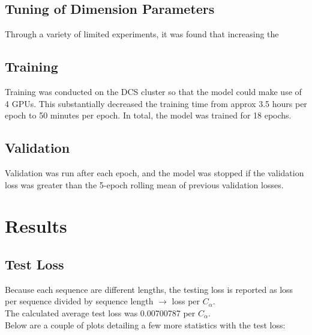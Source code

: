 \documentclass[11pt]{article}
\begin{document}
\subsection{Tuning of Dimension Parameters}
Through a variety of limited experiments, it was found that increasing the 

\subsection{Training}
Training was conducted on the DCS cluster so that the model could make use of 4 GPUs.  This substantially decreased the training time from approx 3.5 hours per epoch to 50 minutes per epoch.  In total, the model was trained for 18 epochs.

\subsection{Validation}
Validation was run after each epoch, and the model was stopped if the validation loss was greater than the 5-epoch rolling mean of previous validation losses.

\section{Results}
\subsection{Test Loss}
Because each sequence are different lengths, the testing loss is reported as loss per sequence divided by sequence length $\longrightarrow$ loss per $C_{\alpha}$.\\
The calculated average test loss was 0.00700787 per $C_{\alpha}$.\\[2mm]
Below are a couple of plots detailing a few more statistics with the test loss:\\[2mm]
\end{document}
